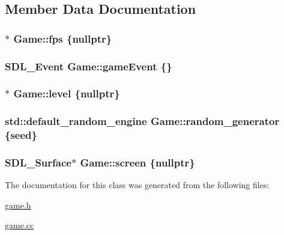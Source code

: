\subsection{Member Data Documentation}
\hypertarget{classGame_a52e8281c6c4ca4a6398e23f0a5d90cce}{
\subsubsection[{fps}]{$\ast$ Game\-::fps \{nullptr\}}}\label{classGame_a52e8281c6c4ca4a6398e23f0a5d90cce}
\hypertarget{classGame_afa62aac0abc3640293e298eec51b85d8}{
\subsubsection[{game\-Event}]{\setlength{\rightskip}{0pt plus 5cm}S\-D\-L\-\_\-\-Event Game\-::game\-Event \{\}}}\label{classGame_afa62aac0abc3640293e298eec51b85d8}
\hypertarget{classGame_a80f3380b4378e8969e230242c56a3361}{
\subsubsection[{level}]{$\ast$ Game\-::level \{nullptr\}}}\label{classGame_a80f3380b4378e8969e230242c56a3361}
\hypertarget{classGame_a239c35e9816b7571609c870d6070fb4b}{
\subsubsection[{random\-\_\-generator}]{\setlength{\rightskip}{0pt plus 5cm}std\-::default\-\_\-random\-\_\-engine Game\-::random\-\_\-generator \{seed\}}}\label{classGame_a239c35e9816b7571609c870d6070fb4b}
\hypertarget{classGame_acc0f346d45bb53307b52acc9cc65912d}{
\subsubsection[{screen}]{\setlength{\rightskip}{0pt plus 5cm}S\-D\-L\-\_\-\-Surface$\ast$ Game\-::screen \{nullptr\}}}\label{classGame_acc0f346d45bb53307b52acc9cc65912d}


The documentation for this class was generated from the following files\-:\begin{DoxyCompactItemize}
\item 
\hyperlink{game_8h}{game.\-h}\item 
\hyperlink{game_8cc}{game.\-cc}\end{DoxyCompactItemize}
